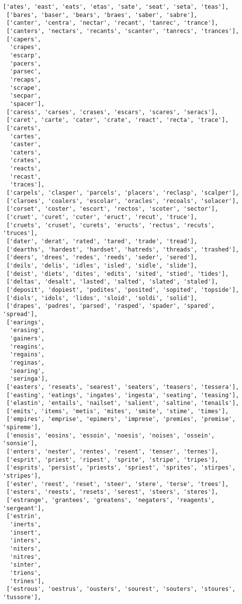 \documentclass[11pt]{article}
\begin{document}
\begin{tcolorbox}[breakable, size=fbox, boxrule=.5pt, pad at break*=1mm, opacityfill=0]
\begin{Verbatim}[commandchars=\\\{\}]
 ['ates', 'east', 'eats', 'etas', 'sate', 'seat', 'seta', 'teas'],
 ['bares', 'baser', 'bears', 'braes', 'saber', 'sabre'],
 ['canter', 'centra', 'nectar', 'recant', 'tanrec', 'trance'],
 ['canters', 'nectars', 'recants', 'scanter', 'tanrecs', 'trances'],
 ['capers',
  'crapes',
  'escarp',
  'pacers',
  'parsec',
  'recaps',
  'scrape',
  'secpar',
  'spacer'],
 ['caress', 'carses', 'crases', 'escars', 'scares', 'seracs'],
 ['caret', 'carte', 'cater', 'crate', 'react', 'recta', 'trace'],
 ['carets',
  'cartes',
  'caster',
  'caters',
  'crates',
  'reacts',
  'recast',
  'traces'],
 ['carpels', 'clasper', 'parcels', 'placers', 'reclasp', 'scalper'],
 ['claroes', 'coalers', 'escolar', 'oracles', 'recoals', 'solacer'],
 ['corset', 'coster', 'escort', 'rectos', 'scoter', 'sector'],
 ['cruet', 'curet', 'cuter', 'eruct', 'recut', 'truce'],
 ['cruets', 'cruset', 'curets', 'eructs', 'rectus', 'recuts', 'truces'],
 ['dater', 'derat', 'rated', 'tared', 'trade', 'tread'],
 ['dearths', 'hardest', 'hardset', 'hatreds', 'threads', 'trashed'],
 ['deers', 'drees', 'redes', 'reeds', 'seder', 'sered'],
 ['deils', 'delis', 'idles', 'isled', 'sidle', 'slide'],
 ['deist', 'diets', 'dites', 'edits', 'sited', 'stied', 'tides'],
 ['deltas', 'desalt', 'lasted', 'salted', 'slated', 'staled'],
 ['deposit', 'dopiest', 'podites', 'posited', 'sopited', 'topside'],
 ['diols', 'idols', 'lidos', 'sloid', 'soldi', 'solid'],
 ['drapes', 'padres', 'parsed', 'rasped', 'spader', 'spared', 'spread'],
 ['earings',
  'erasing',
  'gainers',
  'reagins',
  'regains',
  'reginas',
  'searing',
  'seringa'],
 ['easters', 'reseats', 'searest', 'seaters', 'teasers', 'tessera'],
 ['easting', 'eatings', 'ingates', 'ingesta', 'seating', 'teasing'],
 ['elastin', 'entails', 'nailset', 'salient', 'saltine', 'tenails'],
 ['emits', 'items', 'metis', 'mites', 'smite', 'stime', 'times'],
 ['empires', 'emprise', 'epimers', 'imprese', 'premies', 'premise', 'spireme'],
 ['enosis', 'eosins', 'essoin', 'noesis', 'noises', 'ossein', 'sonsie'],
 ['enters', 'nester', 'rentes', 'resent', 'tenser', 'ternes'],
 ['esprit', 'priest', 'ripest', 'sprite', 'stripe', 'tripes'],
 ['esprits', 'persist', 'priests', 'spriest', 'sprites', 'stirpes', 'stripes'],
 ['ester', 'reest', 'reset', 'steer', 'stere', 'terse', 'trees'],
 ['esters', 'reests', 'resets', 'serest', 'steers', 'steres'],
 ['estrange', 'grantees', 'greatens', 'negaters', 'reagents', 'sergeant'],
 ['estrin',
  'inerts',
  'insert',
  'inters',
  'niters',
  'nitres',
  'sinter',
  'triens',
  'trines'],
 ['estrous', 'oestrus', 'ousters', 'sourest', 'souters', 'stoures', 'tussore'],

\end{Verbatim}
\end{tcolorbox}
\end{document}
